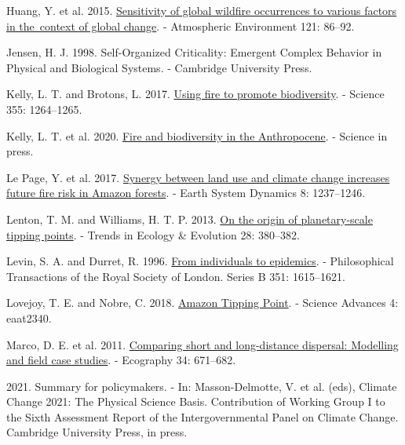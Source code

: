 \documentclass[
]{article}
\newlength{\cslhangindent}
\newenvironment{CSLReferences}[2] %
 {\begin{list}{}{%
  \setlength{\itemindent}{0pt}
  \setlength{\leftmargin}{0pt}
  \setlength{\parsep}{0pt}
  \ifodd #1
   \setlength{\leftmargin}{\cslhangindent}
   \setlength{\itemindent}{-1\cslhangindent}
  \fi
  \setlength{\itemsep}{#2\baselineskip}}}
 {\end{list}}
\begin{document}
\begin{CSLReferences}{1}{1}
Huang, Y. et al. 2015.
\href{https://doi.org/10.1016/j.atmosenv.2015.06.002}{Sensitivity of
global wildfire occurrences to various factors in the~context of global
change}. - Atmospheric Environment 121: 86--92.

Jensen, H. J. 1998. Self-{Organized Criticality}: {Emergent Complex
Behavior} in {Physical} and {Biological Systems}. - {Cambridge
University Press}.

Kelly, L. T. and Brotons, L. 2017.
\href{https://doi.org/10.1126/science.aam7672}{Using fire to promote
biodiversity}. - Science 355: 1264--1265.

Kelly, L. T. et al. 2020.
\href{https://doi.org/10.1126/science.abb0355}{Fire and biodiversity in
the {Anthropocene}}. - Science in press.

Le Page, Y. et al. 2017.
\href{https://doi.org/10.5194/esd-8-1237-2017}{Synergy between land use
and climate change increases future fire risk in {Amazon} forests}. -
Earth System Dynamics 8: 1237--1246.

Lenton, T. M. and Williams, H. T. P. 2013.
\href{https://doi.org/10.1016/j.tree.2013.06.001}{On the origin of
planetary-scale tipping points}. - Trends in Ecology \& Evolution 28:
380--382.

Levin, S. A. and Durret, R. 1996.
\href{https://doi.org/10.1098/rstb.1996.0145}{From individuals to
epidemics}. - Philosophical Transactions of the Royal Society of London.
Series B 351: 1615--1621.

Lovejoy, T. E. and Nobre, C. 2018.
\href{https://doi.org/10.1126/sciadv.aat2340}{Amazon {Tipping Point}}. -
Science Advances 4: eaat2340.

Marco, D. E. et al. 2011.
\href{https://doi.org/10.1111/j.1600-0587.2010.06477.x}{Comparing short
and long-distance dispersal: Modelling and field case studies}. -
Ecography 34: 671--682.

2021. Summary for policymakers. - In: Masson-Delmotte, V. et al. (eds),
Climate {Change} 2021: {The Physical Science Basis}. {Contribution} of
{Working Group I} to the {Sixth Assessment Report} of the
{Intergovernmental Panel} on {Climate Change}. {Cambridge University
Press}, in press.


\end{CSLReferences}
\end{document}
